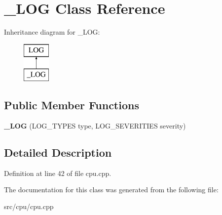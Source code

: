 \hypertarget{class__LOG}{\section{\-\_\-\-L\-O\-G Class Reference}
\label{class__LOG}
}
Inheritance diagram for \-\_\-\-L\-O\-G\-:\begin{figure}[H]
\begin{center}
\leavevmode
\includegraphics[height=2.000000cm]{class__LOG}
\end{center}
\end{figure}
\subsection*{Public Member Functions}
\begin{DoxyCompactItemize}
\item 
\hypertarget{class__LOG_ab6d547f5964f90ac3e7dbbb4cbf46713}{{\bfseries \-\_\-\-L\-O\-G} (L\-O\-G\-\_\-\-T\-Y\-P\-E\-S type, L\-O\-G\-\_\-\-S\-E\-V\-E\-R\-I\-T\-I\-E\-S severity)}\label{class__LOG_ab6d547f5964f90ac3e7dbbb4cbf46713}

\end{DoxyCompactItemize}


\subsection{Detailed Description}


Definition at line 42 of file cpu.\-cpp.



The documentation for this class was generated from the following file\-:\begin{DoxyCompactItemize}
\item 
src/cpu/cpu.\-cpp\end{DoxyCompactItemize}
